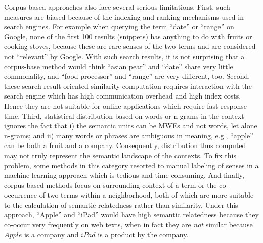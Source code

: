 Corpus-based approaches also face several serious limitations.
First, such measures are
biased because of the indexing and ranking mechanisms used in search
engines. %
For example when querying the term ``date'' or ``range'' on Google,
none of the first 100 results (snippets) has anything to do with
fruits or cooking stoves, because these are rare senses of the two
terms and are considered not ``relevant'' by Google. With such search
results, it is not surprising that a corpus-base method would think
``asian pear'' and ``date'' share very little commonality, and ``food
processor'' and ``range'' are very different, too.  Second, these
search-result oriented similarity computation requires interaction
with the search engine which has high communication overhead and high
index costs. Hence they are not suitable for online applications which
require fast response time.
Third, statistical distribution based on words or n-grams in the
context ignores the fact that i) the semantic units can be MWEs and not
words, let alone n-grams; and ii) many words or phrases are ambiguous
in meaning, e.g., ``apple'' can be both a fruit and a company.
Consequently, distribution thus computed may not truly represent the
semantic landscape of the contexts. To fix this problem, some methods
in this category resorted to manual labeling of senses in a machine
learning approach \cite{Bollegala:2007, Bollegala:Supervised} which is
tedious and time-consuming.  And finally, corpus-based methods focus on
surrounding context of a term or the co-occurrence of two terms within
a neighborhood, both of which are more suitable to the calculation of
semantic relatedness rather than similarity.  Under this approach,
``Apple'' and ``iPad'' would have high semantic relatedness because
they co-occur very frequently on web texts, when in fact they are {\em
  not} similar because $Apple$ is a company and $iPad$ is a product by
the company.

